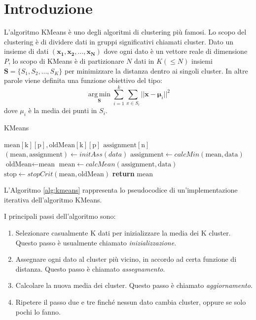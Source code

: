 \documentclass[10pt,twocolumn,letterpaper]{article}
\begin{document}
\section{Introduzione}
L'algoritmo KMeans è uno degli algoritmi di clustering più famosi. Lo scopo del clustering è di dividere dati in gruppi significativi chiamati cluster.
Dato un insieme di dati $(\boldsymbol{x_{1}}, \boldsymbol{x_{2}}, \dots,\boldsymbol{x_{N}} )$ dove ogni dato è un vettore reale di dimensione $P$, lo scopo di KMeans è di partizionare $N$ dati in $K (\leq N)$ insiemi $\boldsymbol{S} = \{S_{1}, S_{2}, \dots, S_{K}\}$ per minimizzare la distanza dentro ai singoli cluster. In altre parole viene definita una funzione obiettivo del tipo: 
\begin{equation}
\label{eq:first}
\operatorname*{arg\, min}_{\boldsymbol{S}} \displaystyle\sum_{i = 1}^{k} \displaystyle\sum_{x \in S_{i}} ||\boldsymbol{x} - \boldsymbol{\mu}_{i} ||^{2}
\end{equation}  
dove $\mu_i$ è la media dei punti in $S_{i}$.\cite{wiki:kmeans}
\par
\begin{algorithm}
\caption{KMeans}
\label{alg:kmeans}
\begin{algorithmic}[1]
\State $\text{mean}[\text{k}][\text{p}], \text{oldMean}[\text{k}][\text{p}]$
\State $\text{assignment}[\text{n}]$
\State $(\text{mean}, \text{assignment}) \leftarrow initAss(data)$
\State $\text{assignment} \leftarrow calcMin(\text{mean}, \text{data})$
\State $\text{oldMean} \leftarrow \text{mean}$
\State $\text{mean} \leftarrow calcMean(\text{assignment}, \text{data})$
\State $\text{stop} \leftarrow stopCrit(\text{mean}, \text{oldMean})$
\EndWhile
\State \textbf{return} $\text{mean}$
\EndProcedure
\end{algorithmic}
\end{algorithm}
L'Algoritmo \ref{alg:kmeans} rappresenta lo pseudocodice di un'implementazione iterativa dell'algoritmo KMeans.

I principali passi dell'algoritmo sono:
\begin{enumerate}
	\item{Selezionare casualmente K dati per inizializzare la media dei K cluster. Questo passo è usualmente chiamato \textit{inizializzazione}.}
	\item{Assegnare ogni dato al cluster più vicino, in accordo ad certa funzione di distanza. Questo passo è chiamato \textit{assegnamento}.}
	\item{Calcolare la nuova media dei cluster. Questo passo è chiamato \textit{aggiornamento}.}
	\item{Ripetere il passo due e tre finché nessun dato cambia cluster, oppure se solo pochi lo fanno.}
\end{enumerate}
\end{document}
